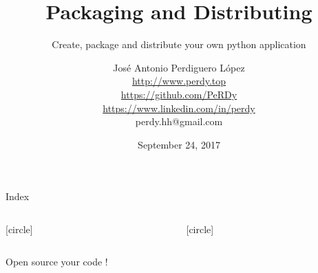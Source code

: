 \documentclass[final, 9pt, svgnames]{beamerPerdy}
\title{Packaging and Distributing}
\subtitle{Create, package and distribute your own python application}
\author[J. A. Perdiguero López]{
José Antonio Perdiguero López\\
\href{http://www.perdy.top}{\scriptsize{\faGlobe\; http://www.perdy.top}}\\
\href{https://github.com/PeRDy}{\scriptsize{\faGithub\; https://github.com/PeRDy}}\\
\href{https://www.linkedin.com/in/perdy}{\scriptsize{\faLinkedin\; https://www.linkedin.com/in/perdy}}\\
\scriptsize{\faAt\; perdy.hh@gmail.com}}
\date{September 24, 2017}
\institute[Piksel]{Lead Developer @ Piksel, Machine Learning Team}
\begin{document}
\begin{frame}
    \titlepage
\end{frame}

\begin{frame}{Index}
    \begin{columns}[t]
        \begin{column}{5cm}
            [circle]
            \tableofcontents[sections={1-2}]
        \end{column}
        \begin{column}{5cm}
            [circle]
            \tableofcontents[sections={3-5}]
        \end{column}
    \end{columns}
\end{frame}







\begin{frame}[standout]
    \Huge{Open source your code !}

    \Huge{\faLinux}
\end{frame}
\end{document}
